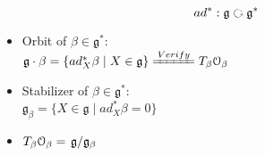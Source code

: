 \documentclass[11pt]{amsart}
\numberwithin{equation}{section}
\theoremstyle{plain}
\theoremstyle{plain}
\numberwithin{equation}{section}
\theoremstyle{remark}
\begin{document}
\begin{minipage}[t]{.5\textwidth}
$$ad^*: \mathfrak{g} \text{ \rotatebox[origin=c]{270}{$\circlearrowleft$} } \mathfrak{g}^*$$
\begin{itemize}
	\item Orbit of $\beta \in \mathfrak{g}^*:$\\
	$\mathfrak{g} \cdot \beta=\{ad_X^* \beta \mid X \in \mathfrak{g}\}\xlongequal{Verify} T_{\beta} \mathcal{O}_{\beta}$
	\item Stabilizer of $\beta \in \mathfrak{g}^*:$\\
	$\mathfrak{g}_{\beta}=\{X \in \mathfrak{g} \mid ad_X^* \beta = 0\}$
	\item $T_{\beta} \mathcal{O}_{\beta}= \left.\mathfrak{g} \middle/ \mathfrak{g}_{\beta}\right.$
\end{itemize}


\end{minipage}








 
   



 








\begin{thebibliography}{99}

 


  

\end{thebibliography}
\end{document}

